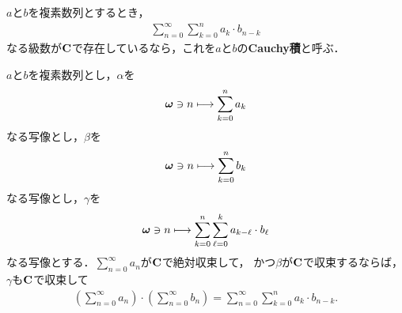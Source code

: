 	$a$と$b$を複素数列とするとき，
	\begin{align}
		\sum_{n=0}^\infty \sum_{k=0}^n a_k \cdot b_{n-k}
	\end{align}
	なる級数が$\mathbf{C}$で存在しているなら，これを$a$と$b$の{\bf Cauchy積}と呼ぶ．
	
	\begin{screen}
		\begin{thm}\label{thm:convolution_of_absolutely_convergent_series}
			$a$と$b$を複素数列とし，$\alpha$を
			\begin{align}
				{\boldsymbol \omega} \ni n \longmapsto \sum_{k=0}^n a_k
			\end{align}
			なる写像とし，$\beta$を
			\begin{align}
				{\boldsymbol \omega} \ni n \longmapsto \sum_{k=0}^n b_k
			\end{align}
			なる写像とし，$\gamma$を
			\begin{align}
				{\boldsymbol \omega} \ni n \longmapsto \sum_{k=0}^n \sum_{\ell = 0}^k a_{k-\ell} \cdot b_\ell
			\end{align}
			なる写像とする．$\sum_{n=0}^\infty a_n$が$\mathbf{C}$で絶対収束して，
			かつ$\beta$が$\mathbf{C}$で収束するならば，$\gamma$も$\mathbf{C}$で収束して
			\begin{align}
				\left(\sum_{n=0}^\infty a_n\right) \cdot \left(\sum_{n=0}^\infty b_n\right)
				= \sum_{n=0}^\infty \sum_{k=0}^n a_k \cdot b_{n-k}.
			\end{align}
		\end{thm}
	\end{screen}
	
